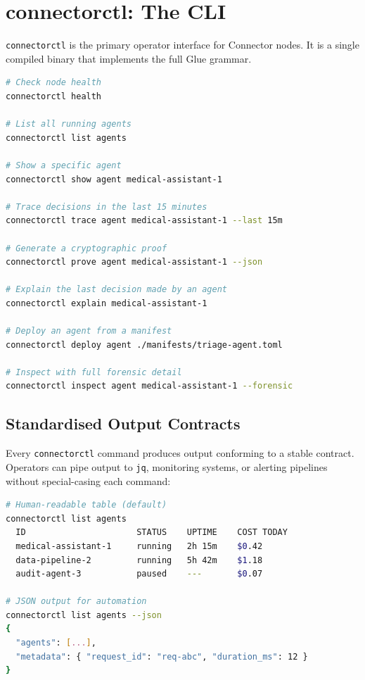 \section{connectorctl: The CLI}

\texttt{connectorctl} is the primary operator interface for Connector nodes.
It is a single compiled binary that implements the full Glue grammar.

\begin{lstlisting}[language=bash, caption=connectorctl example session]
# Check node health
connectorctl health

# List all running agents
connectorctl list agents

# Show a specific agent
connectorctl show agent medical-assistant-1

# Trace decisions in the last 15 minutes
connectorctl trace agent medical-assistant-1 --last 15m

# Generate a cryptographic proof
connectorctl prove agent medical-assistant-1 --json

# Explain the last decision made by an agent
connectorctl explain medical-assistant-1

# Deploy an agent from a manifest
connectorctl deploy agent ./manifests/triage-agent.toml

# Inspect with full forensic detail
connectorctl inspect agent medical-assistant-1 --forensic
\end{lstlisting}

\subsection{Standardised Output Contracts}

Every \texttt{connectorctl} command produces output conforming to a stable
contract. Operators can pipe output to \texttt{jq}, monitoring systems, or
alerting pipelines without special-casing each command:

\begin{lstlisting}[language=bash]
# Human-readable table (default)
connectorctl list agents
  ID                      STATUS    UPTIME    COST TODAY
  medical-assistant-1     running   2h 15m    $0.42
  data-pipeline-2         running   5h 42m    $1.18
  audit-agent-3           paused    ---       $0.07

# JSON output for automation
connectorctl list agents --json
{
  "agents": [...],
  "metadata": { "request_id": "req-abc", "duration_ms": 12 }
}
\end{lstlisting}

